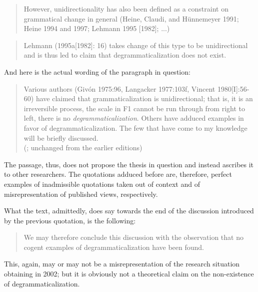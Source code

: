 \begin{quote}
However, unidirectionality has also been defined as a constraint on grammatical change in general (Heine, Claudi, and Hünnemeyer 1991; Heine 1994 and 1997; Lehmann 1995 [1982]; ...)\\
\citep[50]{Norde2009}
\end{quote}

\begin{quote}
Lehmann (1995a[1982]: 16) takes change of this type to be unidirectional and is thus led to claim that degrammaticalization does not exist.\\
\citep[163]{BörjarsEtAl2011}
\end{quote}

\noindent And here is the actual wording of the paragraph in question:

\begin{quote}
Various authors (Givón 1975:96, Langacker 1977:103f, Vincent 1980[I]:56-60) have claimed that grammaticalization is unidirectional; that is, it is an irreversible process, the scale in F1 cannot be run through from right to left, there is no \textit{degrammaticalization}. Others have adduced examples in favor of degrammaticalization. The few that have come to my knowledge will be briefly discussed.\\
(\citealt[14]{Lehmann2002b}; unchanged from the earlier editions)
\end{quote}

\noindent The passage, thus, does not propose the thesis in question and instead ascribes it to other researchers. The quotations adduced before are, therefore, perfect examples of inadmissible quotations taken out of context and of misrepresentation of published views, respectively.

What the text, admittedly, does say towards the end of the discussion introduced by the previous quotation, is the following:

\begin{quote}
We may therefore conclude this discussion with the observation that no cogent examples of degrammaticalization have been found.\\
\citep[17]{Lehmann2002b}
\end{quote}

\noindent This, again, may or may not be a misrepresentation of the research situation obtaining in 2002; but it is obviously not a theoretical claim on the non-existence of degrammaticalization.

